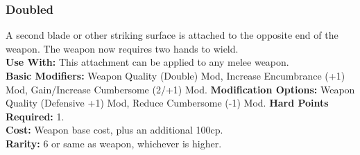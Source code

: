 \subsubsection{Doubled}
A second blade or other striking surface is attached to the
opposite end of the weapon. The weapon now requires
two hands to wield.\\
\textbf{Use With:} This attachment can be applied to any
    melee weapon.\\
\textbf{Basic Modifiers:} Weapon Quality (Double) Mod,
    Increase Encumbrance (+1) Mod, Gain/Increase
    Cumbersome (2/+1) Mod.
\textbf{Modification Options:}
    Weapon Quality (Defensive +1) Mod,
    Reduce Cumbersome (-1) Mod.
\textbf{Hard Points Required:} 1.\\
\textbf{Cost:} Weapon base cost, plus an additional 100cp.\\
\textbf{Rarity:} 6 or same as weapon, whichever is higher.\\
